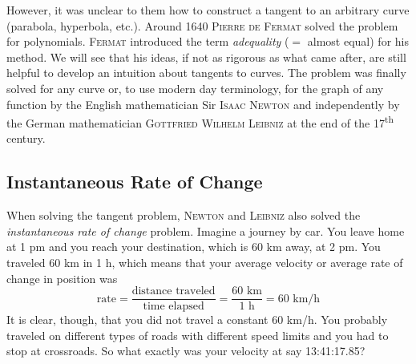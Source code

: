 \documentclass[12pt,eng]{skript_ogg}
\begin{document}
\begin{center}
\end{center}

However, it was unclear to them how to construct a tangent to an arbitrary curve (parabola, hyperbola, etc.). Around 1640 \textsc{Pierre de Fermat} solved the problem for polynomials.  \textsc{Fermat} introduced the term \emph{adequality} ($=$ almost equal) for his method. We will see that his ideas, if not as rigorous as what came after, are still helpful to develop an intuition about tangents to curves. The problem was finally solved for any curve or, to use modern day terminology, for the graph of any function by the English mathematician Sir \textsc{Isaac Newton} and independently by the German mathematician \textsc{Gottfried Wilhelm Leibniz} at the end of the 17\textsuperscript{th} century.

\subsection{Instantaneous Rate of Change}

When solving the tangent problem, \textsc{Newton} and \textsc{Leibniz} also solved the \emph{instantaneous rate of change} problem. Imagine a journey by car. You leave home at 1 pm and you reach your destination, which is 60 km away, at 2 pm. You traveled 60 km in 1 h, which means that your average velocity or average rate of change in position was 
\[\mbox{rate}=\frac{\mbox{distance traveled}}{\mbox{time elapsed}}=\frac{60\mbox{ km}}{1\mbox{ h}}=60\mbox{ km/h}\]
It is clear, though, that you did not travel a constant 60 km/h. You probably traveled on different types of roads with different speed limits and you had to stop at crossroads. So what exactly was your velocity at say 13:41:17.85?
\end{document}
